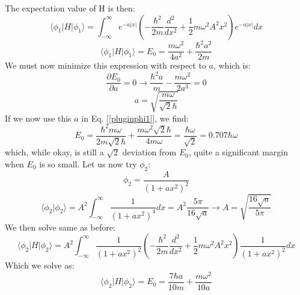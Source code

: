 \documentclass[12pt]{article}
\begin{document}
{\begin{equation*}
\end{equation*}
The expectation value of H is then:
\begin{equation*}
    \langle \phi_1 | H | \phi_1 \rangle = \int_{-\infty}^\infty e^{-a |x|} \left( -\frac{\hbar^2}{2m} \frac{d^2}{dx^2} + \frac{1}{2} m \omega^2 A^2 x^2 \right) e^{-a |x|} dx
\end{equation*}
\begin{equation} \label{pluginphi1}
    \langle \phi_1 | H | \phi_1 \rangle = E_0 = \frac{m \omega^2}{4a^2} + \frac{\hbar^2 a^2}{2m}
\end{equation}
We must now minimize this expression with respect to $a$, which is:
\begin{equation*}
    \frac{\partial E_0}{\partial a} = 0 \xrightarrow[]{} \frac{\hbar^2 a}{m} - \frac{m \omega^2}{2a^3} = 0
\end{equation*}
\begin{equation*}
    a = \sqrt{\frac{m \omega}{\sqrt{2} \hbar}}
\end{equation*}
If we now use this $a$ in Eq. [\ref{pluginphi1}], we find:
\begin{equation} \label{phi1energy}
    E_0 = \frac{\hbar^2 m \omega}{2m \sqrt{2} \hbar} + \frac{m \omega^2 \sqrt{2} \hbar}{4 m \omega} = \frac{\hbar \omega}{\sqrt{2}} = 0.707\hbar\omega
\end{equation}
which, while okay, is still a $\sqrt{2}$ deviation from $E_0$, quite a significant margin when $E_0$ is so small. \newline
Let us now try $\phi_2$:
\begin{equation*}
    \phi_2 = \frac{A}{(1 + ax^2)^2}
\end{equation*}
\begin{equation*}
    \langle \phi_2 | \phi_2 \rangle = A^2 \int_{-\infty}^\infty \frac{1}{(1 + ax^2)^4} dx = A^2 \frac{5 \pi}{16 \sqrt{a}} \xrightarrow[]{} A = \sqrt{\frac{16 \sqrt{a}}{5\pi}}
\end{equation*}
We then solve same as before:
\begin{equation*}
    \langle \phi_2 | H | \phi_2 \rangle = A^2 \int_{-\infty}^\infty \frac{1}{(1 + ax^2)^2} \left( -\frac{\hbar^2}{2m} \frac{d^2}{dx^2} + \frac{1}{2} m \omega^2 A^2 x^2 \right) \frac{1}{(1 + ax^2)^2} dx
\end{equation*}
Which we solve as:
\begin{equation} \label{pluginphi2}
    \langle \phi_2 | H | \phi_2 \rangle = E_0 = \frac{7\hbar a}{10m} + \frac{m \omega^2}{10 a}
\end{equation}
}
\end{document}
